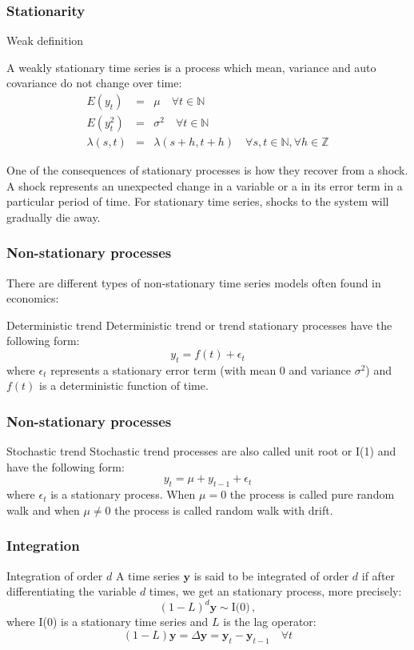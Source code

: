 \documentclass{beamer}
\begin{document}
\begin{frame}
\frametitle{Stationarity}
\begin{block}{Weak definition}

A weakly stationary time series is a process which mean, variance and auto covariance do not change over time:
\small
{\color{blue}
 \begin{eqnarray*} E(y_t) &=& \mu  \quad
\forall t \in \mathbb{N} \\ E(y^2_t) &=& \sigma^2  \quad \forall t \in
\mathbb{N} \\ \lambda(s,t)&=&\lambda(s+h,t+h) \quad \forall s,t \in \mathbb{N},
\forall h \in \mathbb{Z} \end{eqnarray*}}
\end{block}
One of the consequences of stationary processes is how they recover from a shock. A shock represents an unexpected change in a variable or a in its error term in a particular period of time. For stationary time series, shocks to the system will gradually die away. 
\end{frame}


\begin{frame}
\frametitle{Non-stationary processes}
There are different types of non-stationary time series models often found in economics:
\begin{block}{Deterministic trend}
 Deterministic trend or trend stationary
processes have the following form:
{\color{blue}
\[
y_t = f(t) + \epsilon_{t}
\]}
\noindent where $\epsilon_{t}$ represents a stationary error term (with mean 0 and variance $\sigma^2$) and $f(t)$ is a deterministic function of time.
\end{block}
\end{frame}

\begin{frame}
\frametitle{Non-stationary processes}

\begin{block}{Stochastic trend}
Stochastic trend processes are also called {\color{red}unit root or I(1)} and have the following form:
{\color{blue}
\[
y_t = \mu + y_{t-1} + \epsilon_t
\]}
\noindent where $\epsilon_t$ is a stationary process. When $\mu = 0 $ the process is called pure random walk and when $\mu \neq 0$  the process is called random walk with drift.
\end{block}
\end{frame}

\begin{frame}
\frametitle{Integration }
\begin{block}{Integration of order $d$}
A time series $\mathbf{y}$ is said to be integrated of order $d$ if after
differentiating the variable $d$ times, we get an stationary process, more precisely:
\[
(1-L)^d \mathbf{y} \sim \text{I(0)} \, ,
\]
\noindent where I(0) is a stationary time series and $L$ is the lag operator:
\[
(1-L)\mathbf{y} = \Delta \mathbf{y}=\mathbf{y}_t  -\mathbf{y}_{t-1} \quad \forall t
\]
\end{block}
\end{frame}
\end{document}
